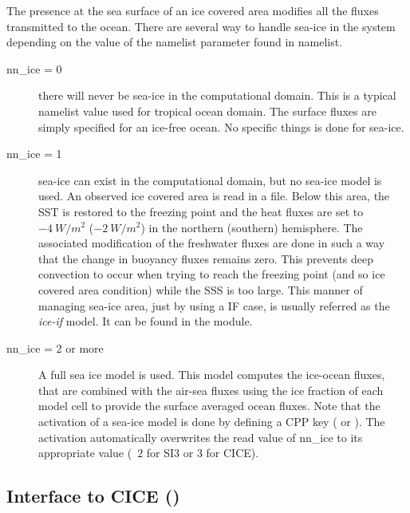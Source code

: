 \documentclass[../main/NEMO_manual]{subfiles}
\begin{document}
The presence at the sea surface of an ice covered area modifies all the fluxes transmitted to the ocean.
There are several way to handle sea-ice in the system depending on
the value of the  namelist parameter found in  namelist.
\begin{description}
\item [nn\_ice = 0] there will never be sea-ice in the computational domain.
  This is a typical namelist value used for tropical ocean domain.
  The surface fluxes are simply specified for an ice-free ocean.
  No specific things is done for sea-ice.
\item [nn\_ice = 1] sea-ice can exist in the computational domain, but no sea-ice model is used.
  An observed ice covered area is read in a file.
  Below this area, the SST is restored to the freezing point and
  the heat fluxes are set to $-4~W/m^2$ ($-2~W/m^2$) in the northern (southern) hemisphere.
  The associated modification of the freshwater fluxes are done in such a way that
  the change in buoyancy fluxes remains zero.
  This prevents deep convection to occur when trying to reach the freezing point
  (and so ice covered area condition) while the SSS is too large.
  This manner of managing sea-ice area, just by using a IF case,
  is usually referred as the \textit{ice-if} model.
  It can be found in the  module.
\item [nn\_ice = 2 or more] A full sea ice model is used.
  This model computes the ice-ocean fluxes,
  that are combined with the air-sea fluxes using the ice fraction of each model cell to
  provide the surface averaged ocean fluxes.
  Note that the activation of a sea-ice model is done by defining a CPP key ( or ).
  The activation automatically overwrites the read value of nn\_ice to its appropriate value
  (\ie\ $2$ for SI3 or $3$ for CICE).
\end{description}


\subsection[Interface to CICE (\textit{sbcice\_cice.F90})]{Interface to CICE (\protect{})}
\label{subsec:SBC_cice}
\end{document}
